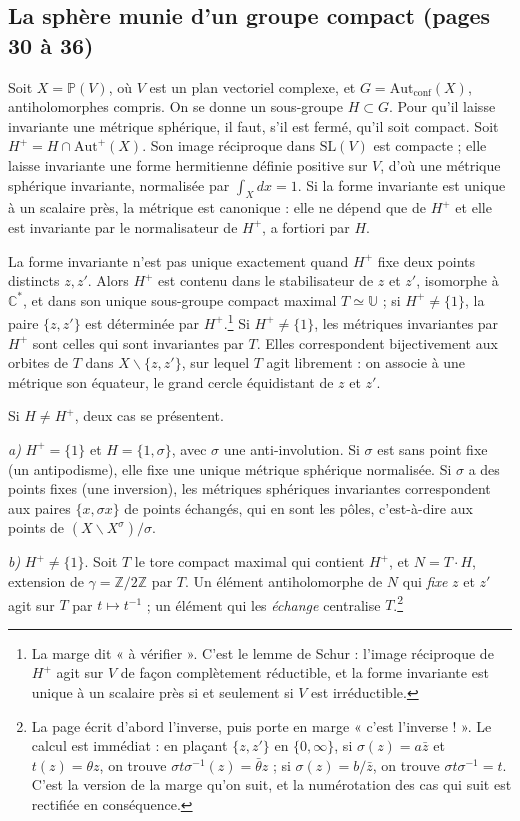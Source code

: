 \documentclass[11pt,a4paper]{article}
\begin{document}
\subsection*{La sphère munie d'un groupe compact (pages 30 à 36)}

Soit $X = \mathbb{P}(V)$, où $V$ est un plan vectoriel complexe, et
$G = \mathrm{Aut}_{\mathrm{conf}}(X)$, antiholomorphes compris. On se donne
un sous-groupe $H \subset G$. Pour qu'il laisse invariante une métrique
sphérique, il faut, s'il est fermé, qu'il soit compact. Soit
$H^{+} = H \cap \mathrm{Aut}^{+}(X)$. Son image réciproque dans
$\mathrm{SL}(V)$ est compacte ; elle laisse invariante une forme hermitienne
définie positive sur $V$, d'où une métrique sphérique invariante, normalisée
par $\int_X dx = 1$. Si la forme invariante est unique à un scalaire près, la
métrique est canonique : elle ne dépend que de $H^{+}$ et elle est invariante
par le normalisateur de $H^{+}$, a fortiori par $H$.

La forme invariante n'est pas unique exactement quand $H^{+}$ fixe deux points
distincts $z, z'$. Alors $H^{+}$ est contenu dans le stabilisateur de $z$ et
$z'$, isomorphe à $\mathbb{C}^{*}$, et dans son unique sous-groupe compact
maximal $T \simeq \mathbb{U}$ ; si $H^{+} \neq \{1\}$, la paire $\{z,z'\}$
est déterminée par $H^{+}$.\footnote{La marge dit « à vérifier ». C'est le
lemme de Schur : l'image réciproque de $H^{+}$ agit sur $V$ de façon
complètement réductible, et la forme invariante est unique à un scalaire près
si et seulement si $V$ est irréductible.} Si $H^{+} \neq \{1\}$, les
métriques invariantes par $H^{+}$ sont celles qui sont invariantes par $T$.
Elles correspondent bijectivement aux orbites de $T$ dans $X \smallsetminus
\{z, z'\}$, sur lequel $T$ agit librement : on associe à une métrique son
équateur, le grand cercle équidistant de $z$ et $z'$.

Si $H \neq H^{+}$, deux cas se présentent.

\emph{a)} $H^{+} = \{1\}$ et $H = \{1, \sigma\}$, avec $\sigma$ une
anti-involution. Si $\sigma$ est sans point fixe (un antipodisme), elle fixe
une unique métrique sphérique normalisée. Si $\sigma$ a des points fixes (une
inversion), les métriques sphériques invariantes correspondent aux paires
$\{x, \sigma x\}$ de points échangés, qui en sont les pôles, c'est-à-dire aux
points de $(X \smallsetminus X^{\sigma})/\sigma$.

\emph{b)} $H^{+} \neq \{1\}$. Soit $T$ le tore compact maximal qui contient
$H^{+}$, et $N = T\cdot H$, extension de $\gamma = \mathbb{Z}/2\mathbb{Z}$ par
$T$. Un élément antiholomorphe de $N$ qui \emph{fixe} $z$ et $z'$ agit sur $T$
par $t \mapsto t^{-1}$ ; un élément qui les \emph{échange} centralise
$T$.\footnote{La page écrit d'abord l'inverse, puis porte en marge « c'est
l'inverse ! ». Le calcul est immédiat : en plaçant $\{z,z'\}$ en
$\{0,\infty\}$, si $\sigma(z) = a\bar z$ et $t(z) = \theta z$, on trouve
$\sigma t \sigma^{-1}(z) = \bar\theta z$ ; si $\sigma(z) = b/\bar z$, on
trouve $\sigma t\sigma^{-1} = t$. C'est la version de la marge qu'on suit,
et la numérotation des cas qui suit est rectifiée en conséquence.}
\end{document}

